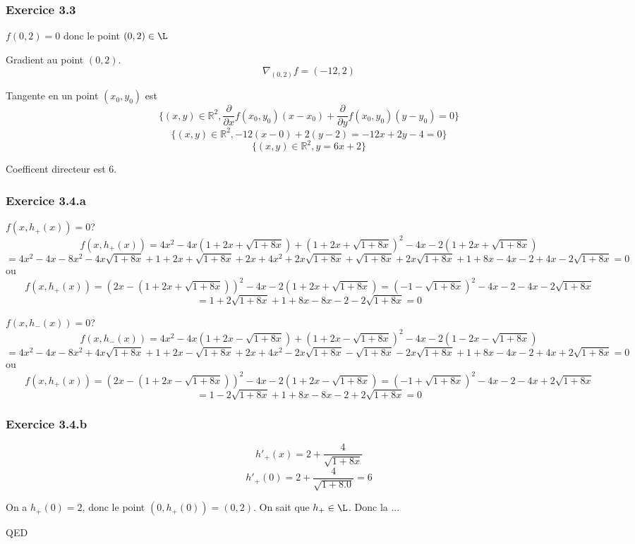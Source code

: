 \documentclass[]{book}
\theoremstyle{definition}
\newcommand{\bb}[1]{\mathbb{#1}}
\newcommand{\R}{\bb{R}}
\begin{document}
\subsubsection*{Exercice 3.3}
$f(0,2) = 0$ donc le point $(0,2) \in \L$

Gradient au point $(0,2)$.
$$\nabla_{(0,2)} f = (-12,2)$$

Tangente en un point $(x_0,y_0)$ est
$$\{(x,y) \in \R^2, \frac{\partial }{\partial x}f(x_0,y_0)(x-x_0) + \frac{\partial }{\partial y}f(x_0,y_0)(y-y_0) = 0\}$$ 
$$\{(x,y) \in \R^2, -12(x-0) + 2 (y-2) = -12x + 2y -4 = 0\}$$
$$\{(x,y) \in \R^2,  y = 6x + 2\}$$

Coefficent directeur est 6.

\subsubsection*{Exercice 3.4.a}
$f(x,h_{+}(x)) = 0$?
$$f(x,h_{+}(x)) = 4x^2 -4x(1+2x+\sqrt{1+8x}) + (1+2x+\sqrt{1+8x})^2 - 4x -2(1+2x+\sqrt{1+8x})$$
$$ = 4x^2 -4x -8x^2 -4x\sqrt{1+8x} + 1 +2x + \sqrt{1+8x} + 2x +4x^2 +2x\sqrt{1+8x} + \sqrt{1+8x} +2x\sqrt{1+8x}+1+8x -4x -2 + 4x -2\sqrt{1+8x}= 0$$
ou
$$f(x,h_{+}(x)) = (2x-(1+2x+\sqrt{1+8x}))^2 - 4x -2(1+2x+\sqrt{1+8x}) = (-1-\sqrt{1+8x})^2 - 4x - 2 - 4x - 2\sqrt{1+8x}$$
$$= 1 + 2\sqrt{1+8x} + 1 +8x - 8x -2 - 2\sqrt{1+8x} = 0$$

$f(x,h_{-}(x)) = 0$?
$$f(x,h_{-}(x)) = 4x^2 -4x(1+2x-\sqrt{1+8x}) + (1+2x-\sqrt{1+8x})^2 - 4x -2(1-2x-\sqrt{1+8x})$$
$$ = 4x^2 -4x -8x^2 + 4x\sqrt{1+8x} + 1 +2x - \sqrt{1+8x} + 2x +4x^2 - 2x\sqrt{1+8x} - \sqrt{1+8x} -2x\sqrt{1+8x}+1+8x -4x -2 + 4x +2\sqrt{1+8x}= 0 $$
ou
$$f(x,h_{+}(x)) = (2x-(1+2x-\sqrt{1+8x}))^2 - 4x -2(1+2x-\sqrt{1+8x}) = (-1+\sqrt{1+8x})^2 - 4x - 2 - 4x + 2\sqrt{1+8x}$$
$$= 1 - 2\sqrt{1+8x} + 1 +8x - 8x -2 + 2\sqrt{1+8x} = 0$$

\subsubsection*{Exercice 3.4.b}
$$h'_{+}(x) = 2 + \frac{4}{\sqrt{1+8x}}$$
$$h'_{+}(0) = 2 + \frac{4}{\sqrt{1+8.0}} = 6$$

On a $h_{+}(0) = 2$, donc le point $(0,h_{+}(0)) = (0,2)$. On sait que $h_{+} \in \L$. Donc la ...


QED
\end{document}

